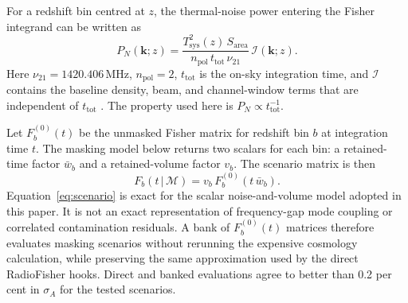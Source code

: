 For a redshift bin centred at $z$, the thermal-noise power entering the
Fisher integrand can be written as
\begin{equation}
\label{eq:noise}
P_N(\mathbf{k};z) =
\frac{T_\mathrm{sys}^2(z)\,S_\mathrm{area}}
     {n_\mathrm{pol}\,t_\mathrm{tot}\,\nu_{21}}\,
\mathcal{I}(\mathbf{k};z).
\end{equation}
Here $\nu_{21}=1420.406$\,MHz, $n_\mathrm{pol}=2$, $t_\mathrm{tot}$ is
the on-sky integration time, and $\mathcal{I}$ contains the baseline
density, beam, and channel-window terms that are independent of
$t_\mathrm{tot}$ \citep[Eq.~A9]{CHIMEOverview2022}. The property used
here is $P_N\propto t_\mathrm{tot}^{-1}$.

Let $F_b^{(0)}(t)$ be the unmasked Fisher matrix for redshift bin $b$ at
integration time $t$. The masking model below returns two scalars for
each bin: a retained-time factor $\bar{w}_b$ and a retained-volume
factor $v_b$. The scenario matrix is then
\begin{equation}
\label{eq:scenario}
F_b(t\,|\,\mathcal{M}) = v_b\,F_b^{(0)}(t\,\bar{w}_b).
\end{equation}
Equation~\eqref{eq:scenario} is exact for the scalar noise-and-volume
model adopted in this paper. It is not an exact representation of
frequency-gap mode coupling or correlated contamination residuals. A
bank of $F_b^{(0)}(t)$ matrices therefore evaluates masking scenarios
without rerunning the expensive cosmology calculation, while preserving
the same approximation used by the direct RadioFisher hooks. Direct and
banked evaluations agree to better than 0.2 per cent in $\sigma_A$ for
the tested scenarios.

